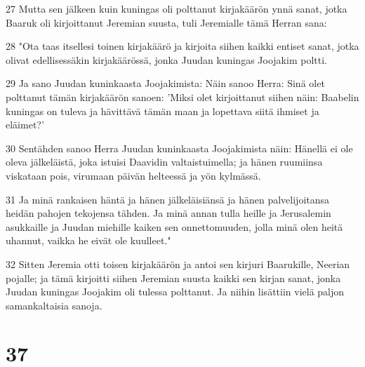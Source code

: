 \par 27 Mutta sen jälkeen kuin kuningas oli polttanut kirjakäärön ynnä sanat, jotka Baaruk oli kirjoittanut Jeremian suusta, tuli Jeremialle tämä Herran sana:
\par 28 "Ota taas itsellesi toinen kirjakäärö ja kirjoita siihen kaikki entiset sanat, jotka olivat edellisessäkin kirjakäärössä, jonka Juudan kuningas Joojakim poltti.
\par 29 Ja sano Juudan kuninkaasta Joojakimista: Näin sanoo Herra: Sinä olet polttanut tämän kirjakäärön sanoen: 'Miksi olet kirjoittanut siihen näin: Baabelin kuningas on tuleva ja hävittävä tämän maan ja lopettava siitä ihmiset ja eläimet?'
\par 30 Sentähden sanoo Herra Juudan kuninkaasta Joojakimista näin: Hänellä ei ole oleva jälkeläistä, joka istuisi Daavidin valtaistuimella; ja hänen ruumiinsa viskataan pois, virumaan päivän helteessä ja yön kylmässä.
\par 31 Ja minä rankaisen häntä ja hänen jälkeläisiänsä ja hänen palvelijoitansa heidän pahojen tekojensa tähden. Ja minä annan tulla heille ja Jerusalemin asukkaille ja Juudan miehille kaiken sen onnettomuuden, jolla minä olen heitä uhannut, vaikka he eivät ole kuulleet."
\par 32 Sitten Jeremia otti toisen kirjakäärön ja antoi sen kirjuri Baarukille, Neerian pojalle; ja tämä kirjoitti siihen Jeremian suusta kaikki sen kirjan sanat, jonka Juudan kuningas Joojakim oli tulessa polttanut. Ja niihin lisättiin vielä paljon samankaltaisia sanoja.

\chapter{37}

